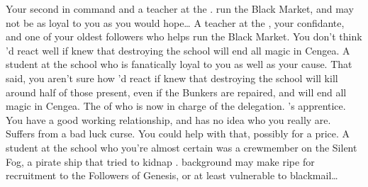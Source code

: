 \documentclass[char]{GL2020}
\begin{document}
\begin{contacts}
	\contact{\cChupSecond{}} Your second in command and a teacher at the \pSc{}. \cChupSecond{\They} run\cChupSecond{\plural} the Black Market, and may not be as loyal to you as you would hope\ldots{}
	\contact{\cChupInventor{}} A teacher at the \pSc{}, your confidante, and one of your oldest followers who helps run the Black Market. You don't think \cChupInventor{\they}'d react well if \cChupInventor{\they} knew that destroying the school will end all magic in Cengea.
	\contact{\cChupStudent{}} A student at the school who is fanatically loyal to you as well as your cause. That said, you aren't sure how \cChupStudent{\they}'d react if \cChupStudent{\they} knew that destroying the school will kill around half of those present, even if the Bunkers are repaired, and will end all magic in Cengea.
	\contact{\cEbbPriest{}} The \cEbbPriest{\cleric} of \cEbb{} who is now in charge of the \pShip{} delegation.
	\contact{\cJuniorStatesman{}} \cHeadDiplomat{}'s apprentice. You have a good working relationship, and \cJuniorStatesman{} has no idea who you really are.
	\contact{\cInitiate{}} Suffers from a bad luck curse. You could help with that, possibly for a price.
\contact{\cPirateChild{}} A student at the school  who you're almost certain was a crewmember on the Silent Fog, a pirate ship that tried to kidnap \cHeadDiplomat{}. \cPirateChild{\Their} background may make \cPirateChild{\them} ripe for recruitment to the Followers of Genesis, or at least vulnerable to blackmail\ldots{}
\end{contacts}
\end{document}

